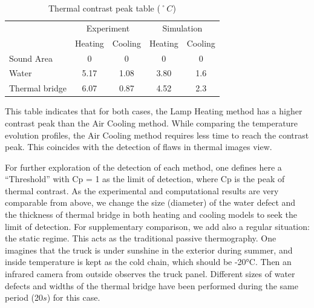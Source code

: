 \documentclass{tQRT2e}
\begin{document}
\begin{table}[ht]
	\centering
	\caption{Thermal contrast peak table ($˚C$)}
	\begin{tabular}{l|cc|cc}
		\hline
		& \multicolumn{2}{c|}{Experiment} & \multicolumn{2}{c}{Simulation} \\
		 & Heating & Cooling & Heating & Cooling \\
		\hline
		Sound Area & 0 & 0 & 0 & 0 \\
		Water & 5.17 & 1.08 & 3.80 & 1.6 \\
		Thermal bridge & 6.07 & 0.87 & 4.52 & 2.3 \\
		\hline
	\end{tabular}
	\label{tab_TCP}
\end{table}
This table indicates that for both cases, the Lamp Heating method has a higher contrast peak than the Air Cooling method. While comparing the temperature evolution profiles, the Air Cooling method requires less time to reach the contrast peak. This coincides with the detection of flaws in thermal images view.

For further exploration of the detection of each method, one defines here a “Threshold” with Cp = 1 as the limit of detection, where Cp is the peak of thermal contrast. As the experimental and computational results are very comparable from above, we change the size (diameter) of the water defect and the thickness of thermal bridge in both heating and cooling models to seek the limit of detection. For supplementary comparison, we add also a regular situation: the static regime. This acts as the traditional passive thermography. One imagines that the truck is under sunshine in the exterior during summer, and inside temperature is kept as the cold chain, which should be -20°C. Then an infrared camera from outside observes the truck panel. Different sizes of water defects and widths of the thermal bridge have been performed during the same period (20$ s $) for this case.
\end{document}
